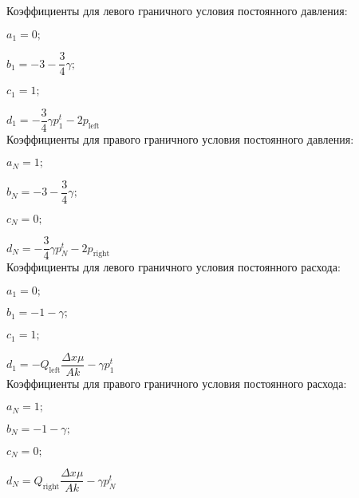 Коэффициенты для левого граничного условия постоянного давления:

$a_1=0;$

$b_1=-3-\dfrac{3}{4}\gamma;$

$c_1=1;$

$d_1=-\dfrac{3}{4}\gamma p_1^t-2p_{\text{left}}$
\ \\

Коэффициенты для правого граничного условия постоянного давления:

$a_N=1;$

$b_N=-3-\dfrac{3}{4}\gamma;$

$c_N=0;$

$d_N=-\dfrac{3}{4}\gamma p_N^t-2p_{\text{right}}$
\ \\

Коэффициенты для левого граничного условия постоянного расхода:

$a_1=0;$

$b_1=-1-\gamma;$

$c_1=1;$

$d_1=-Q_{\text{left}}\dfrac{\Delta x \mu}{Ak}-\gamma p_1^t$
\ \\

Коэффициенты для правого граничного условия постоянного расхода:

$a_N=1;$

$b_N=-1-\gamma;$

$c_N=0;$

$d_N=Q_{\text{right}}\dfrac{\Delta x \mu}{Ak}-\gamma p_N^t$

